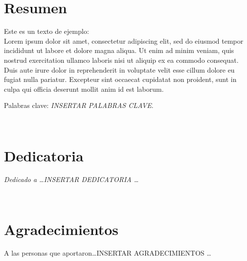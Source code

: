 \thispagestyle{empty}
\hbox{}
\cleardoublepage

\begin{preface}

\section{Resumen}

Este es un texto\: de\: ejemplo:
\\Lorem ipsum dolor sit amet, consectetur adipiscing elit, sed do eiusmod tempor incididunt ut labore et dolore magna aliqua. Ut enim ad minim veniam, quis nostrud exercitation ullamco laboris nisi ut aliquip ex ea commodo consequat. Duis aute irure dolor in reprehenderit in voluptate velit esse cillum dolore eu fugiat nulla pariatur. Excepteur sint occaecat cupidatat non proident, sunt in culpa qui officia deserunt mollit anim id est laborum.

\bigskip

\bigskip

Palabras clave: \emph{INSERTAR PALABRAS CLAVE}.


\cleardoublepage
\thispagestyle{empty}
\hbox{ }
\cleardoublepage

\section{Dedicatoria}

\begin{center}
\emph{Dedicado a \ldots INSERTAR DEDICATORIA \ldots}
\end{center}

\cleardoublepage
\thispagestyle{empty}
\hbox{ }
\cleardoublepage

\section{Agradecimientos}

A las personas que aportaron\ldots INSERTAR AGRADECIMIENTOS \ldots

\cleardoublepage
\thispagestyle{empty}
\hbox{ }
\cleardoublepage

\tableofcontents

\cleardoublepage
\thispagestyle{empty}
\hbox{ }
\cleardoublepage

\listoftables

\cleardoublepage
\thispagestyle{empty}
\hbox{ }
\cleardoublepage

\listoffigures

\end{preface}